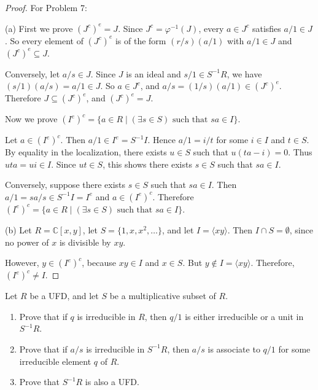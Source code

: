 \documentclass[addpoints,10pt]{exam}
\theoremstyle{plain}
\theoremstyle{definition}
\newtheorem{prob}[thm]{Problem}
\theoremstyle{plain}
\theoremstyle{definition}
\let\oldprob\prob
\let\endoldprob\endprob
\renewenvironment{prob}
  {\begin{singlespace}\oldprob}
  {\endoldprob\end{singlespace}}
\newcommand{\CC}{\ensuremath{\mathbb{C}}}
\begin{document}
\begin{proof}
For Problem 7:

(a)
First we prove $(J^c)^e=J$. Since $J^c=\varphi^{-1}(J)$, every
$a\in J^c$ satisfies $a/1\in J$. So every element of $(J^c)^e$ is of
the form $(r/s)(a/1)$ with $a/1\in J$ and $(J^c)^e\subseteq J$.

Conversely, let $a/s\in J$. Since $J$ is an ideal and $s/1\in S^{-1}R$,
we have $(s/1)(a/s)=a/1\in J$. So $a\in J^c$, and
$a/s=(1/s)(a/1)\in (J^c)^e$. Therefore $J\subseteq (J^c)^e$, and
$(J^c)^e=J$.

Now we prove
$(I^e)^c=\{a\in R\mid (\exists s\in S)\text{ such that }sa\in I\}$.

Let $a\in (I^e)^c$. Then $a/1\in I^e=S^{-1}I$. Hence
$a/1=i/t$ for some $i\in I$ and $t\in S$. By equality in the
localization, there exists $u\in S$ such that $u(ta-i)=0$. Thus
$uta=ui\in I$. Since $ut\in S$, this shows there exists $s\in S$ such
that $sa\in I$.

Conversely, suppose there exists $s\in S$ such that $sa\in I$. Then
$a/1=sa/s\in S^{-1}I=I^e$ and $a\in (I^e)^c$. Therefore
$(I^e)^c=\{a\in R\mid (\exists s\in S)\text{ such that }sa\in I\}$.

(b)
Let $R=\CC[x,y]$, let $S=\{1,x,x^2,\dots\}$, and let $I=\langle xy\rangle$.
Then $I\cap S=\emptyset$, since no power of $x$ is divisible by $xy$.

However, $y\in (I^e)^c$, because $xy\in I$ and $x\in S$. But
$y\notin I=\langle xy\rangle $. Therefore, $(I^e)^c\neq I$.
\end{proof}

\newpage
\begin{prob}
Let $R$ be a UFD, and let $S$ be a multiplicative subset of $R$.

\begin{enumerate}[label=(\alph*)]
\item Prove that if $q$ is irreducible in $R$, then $q/1$ is either irreducible or a unit in $S^{-1}R$.

\item Prove that if $a/s$ is irreducible in $S^{-1}R$, then $a/s$ is associate to $q/1$ for some irreducible element $q$ of $R$.

\item Prove that $S^{-1}R$ is also a UFD.
\end{enumerate}
\end{prob}
\end{document}
